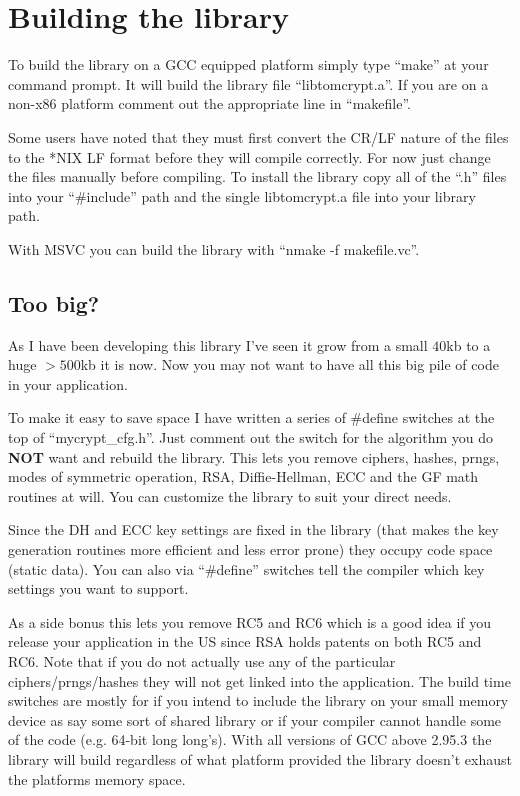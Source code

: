 \documentclass{book}
\begin{document}
\section{Building the library}

To build the library on a GCC equipped platform simply type ``make'' at your command prompt.  It will build the library
file ``libtomcrypt.a''.  If you are on a non-x86 platform comment out the appropriate line in ``makefile''.  

Some users have noted that they must first convert the CR/LF nature of the files to the *NIX LF format before they will
compile correctly.  For now just change the files
manually before compiling.  To install the library copy all of the ``.h'' files into your ``\#include'' path and the 
single libtomcrypt.a file into your library path.

With MSVC you can build the library with ``nmake -f makefile.vc''.

\subsection{Too big?}
As I have been developing this library I've seen it grow from a small $40$kb to a huge $>500$kb it is now.  Now you 
may not want to have all this big pile of code in your application.

To make it easy to save space I have written a series of \#define switches at the top of ``mycrypt\_cfg.h''.  Just comment out the
switch for the algorithm you do {\bf NOT} want and rebuild the library.  This lets you remove ciphers, hashes, prngs, modes of
symmetric operation, RSA, Diffie-Hellman, ECC and the GF math routines at will.  You can customize the library to suit your 
direct needs.  

Since the DH and ECC key settings are fixed in the library (that makes the key generation routines more efficient and less
error prone) they occupy code space (static data).  You can also via ``\#define'' switches tell the compiler which
key settings you want to support.

As a side bonus this lets you remove RC5 and RC6 which is a good idea if you release your application in the US since RSA holds
patents on both RC5 and RC6.  Note that if you do not actually use any of the particular ciphers/prngs/hashes they will not get 
linked into the application.  The build time switches are mostly for if you intend to include the library on your small memory device
as say some sort of shared library or if your compiler cannot handle some of the code (e.g. 64-bit long long's).  With all 
versions of GCC above 2.95.3 the library will build regardless of what platform provided the library doesn't exhaust 
the platforms memory space.
\end{document}
